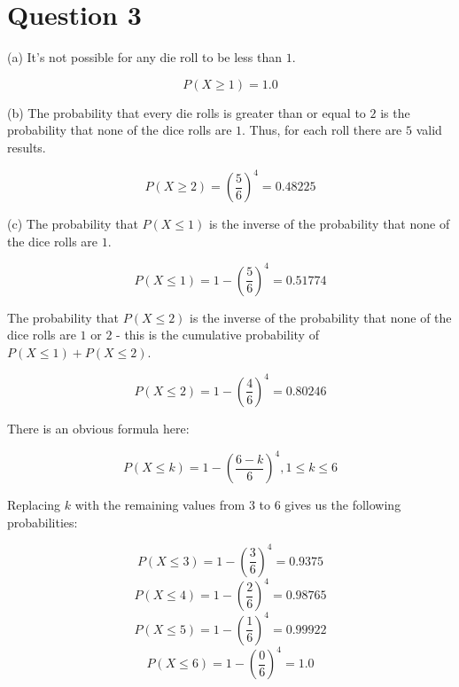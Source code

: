 \documentclass[12pt]{article}
\begin{document}
\begin{center}
\end{center}

\section*{Question 3}

\noindent (a) It's not possible for any die roll to be less than $1$.

$$ P(X \geq 1) = 1.0 $$

\noindent (b) The probability that every die rolls is greater than or equal to $2$ is the probability that none of the dice rolls are $1$. Thus, for each roll there are $5$ valid results.

$$ P(X \geq 2) = \left( \frac{5}{6} \right)^4 = 0.48225 $$

\noindent (c) The probability that $P(X \leq 1)$ is the inverse of the probability that none of the dice rolls are $1$.

$$ P(X \leq 1) = 1 - \left( \frac{5}{6} \right)^4 = 0.51774 $$

\indent The probability that $P(X \leq 2)$ is the inverse of the probability that none of the dice rolls are $1$ or $2$ - this is the cumulative probability of $P(X \leq 1) + P(X \leq 2)$.

$$ P(X \leq 2) = 1 - \left( \frac{4}{6} \right)^4 = 0.80246 $$

\indent There is an obvious formula here:

$$ P(X \leq k) = 1 - \left( \frac{6 - k}{6} \right)^4, 1 \leq k \leq 6 $$

\indent Replacing $k$ with the remaining values from $3$ to $6$ gives us the following probabilities:

$$ P(X \leq 3) = 1 - \left( \frac{3}{6} \right)^4 = 0.9375 $$
$$ P(X \leq 4) = 1 - \left( \frac{2}{6} \right)^4 = 0.98765 $$
$$ P(X \leq 5) = 1 - \left( \frac{1}{6} \right)^4 = 0.99922 $$
$$ P(X \leq 6) = 1 - \left( \frac{0}{6} \right)^4 = 1.0 $$
\end{document}

